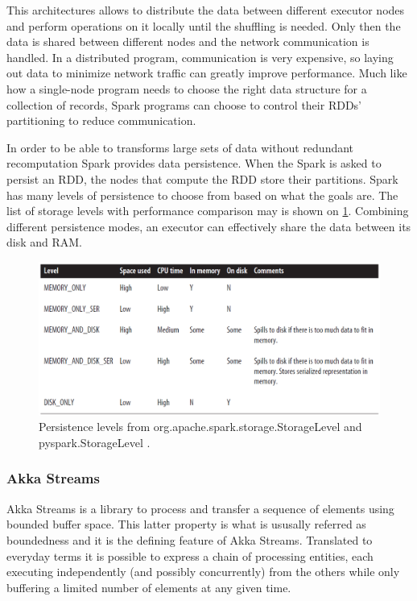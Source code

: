 This architectures allows to distribute the data between different executor nodes and perform operations on it locally until the shuffling is needed. Only then the data is shared between different nodes and the network communication is handled. In a distributed program, communication is very expensive, so laying out data to minimize network traffic can greatly improve performance. Much like how a single-node program needs to choose the right data structure for a collection of records, Spark programs can choose to control their RDDs’ partitioning to reduce communication.

In order to be able to transforms large sets of data without redundant recomputation Spark provides data persistence. When the Spark is asked to persist an RDD, the nodes that compute the RDD store their partitions. Spark has many levels of persistence to choose from based on what the goals are. The list of storage levels with performance comparison may is shown on \ref{img:spark_persistence_levels}. Combining different persistence modes, an executor can effectively share the data between its disk and RAM.

\begin{figure}
\centering \includegraphics[width=.6\textwidth]{img/spark_persistence_levels}
\caption{ Persistence levels from org.apache.spark.storage.StorageLevel and
pyspark.StorageLevel \cite{learning_spark}.}\label{img:spark_persistence_levels}
\end{figure}

\subsubsection{Akka Streams}

Akka Streams is a library to process and transfer a sequence of elements using bounded buffer space. This latter property is what is ususally referred as boundedness and it is the defining feature of Akka Streams. Translated to everyday terms it is possible to express a chain of processing entities, each executing independently (and possibly concurrently) from the others while only buffering a limited number of elements at any given time. 

